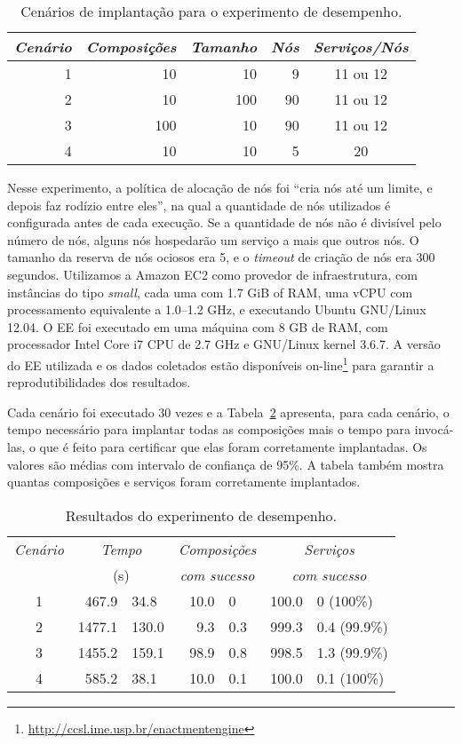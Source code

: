 \begin{table}[h!]
\centering
\caption{Cenários de implantação para o experimento de desempenho.}
\label{tab:cases}
\begin{tabular}{r r r r c} \hline
\emph{Cenário} & \emph{Composições} & \emph{Tamanho} & \emph{Nós} & \emph{Serviços/Nós} \\ \hline
1 &  10 &  10 &  9 & 11 ou 12 \\
2 &  10 & 100 & 90 & 11 ou 12 \\
3 & 100 &  10 & 90 & 11 ou 12 \\
4 &  10 &  10 &  5 &       20 \\
\hline \end{tabular}
\end{table}

Nesse experimento, a política de alocação de nós foi ``cria nós até um limite, e depois faz rodízio entre eles'',
na qual a quantidade de nós utilizados é configurada antes de cada execução.
Se a quantidade de nós não é divisível pelo número de nós,
alguns nós hospedarão um serviço a mais que outros nós.
O tamanho da reserva de nós ociosos era 5,
e o \emph{timeout} de criação de nós era 300 segundos.
Utilizamos a Amazon EC2 como provedor de infraestrutura,
com instâncias do tipo \emph{small},
cada uma com 1.7 GiB of RAM, uma vCPU com processamento
equivalente a 1.0--1.2 GHz, e executando Ubuntu GNU/Linux 12.04.
O EE foi executado em uma máquina com 8 GB de RAM,
com processador Intel Core i7 CPU de 2.7 GHz e GNU/Linux kernel 3.6.7.
A versão do EE utilizada e os dados coletados estão disponíveis 
on-line\footnote{\url{http://ccsl.ime.usp.br/enactmentengine}}
para garantir a reprodutibilidades dos resultados.

Cada cenário foi executado 30 vezes e a Tabela~\ref{tab:results}
apresenta, para cada cenário, o tempo necessário para implantar
todas as composições mais o tempo para invocá-las, o que é feito
para certificar que elas foram corretamente implantadas.
Os valores são médias com intervalo de confiança de 95\%.
A tabela também mostra quantas composições e serviços foram corretamente implantados.

\begin{table}
\centering
\caption{Resultados do experimento de desempenho.}
\label{tab:results}
\begin{tabular}{c r@{ $\pm$ }l r@{ $\pm$ }l r@{ $\pm$ }l} \hline

\emph{Cenário} & \multicolumn{2}{c}{\emph{Tempo}} & \multicolumn{2}{c}{\emph{Composições}}   & \multicolumn{2}{c}{\emph{Serviços}}\\
                 & \multicolumn{2}{c}{(s)}           & \multicolumn{2}{c}{\emph{com sucesso}} & \multicolumn{2}{c}{\emph{com sucesso}}\\
\hline
1 &  467.9 &  34.8 & 10.0 & 0   & 100.0 & 0   (100\%) \\
2 & 1477.1 & 130.0 &  9.3 & 0.3 & 999.3 & 0.4 (99.9\%)\\
3 & 1455.2 & 159.1 & 98.9 & 0.8 & 998.5 & 1.3 (99.9\%)\\
4 &  585.2 &  38.1 & 10.0 & 0.1 & 100.0 & 0.1 (100\%)\\
\hline \end{tabular}
\end{table}

